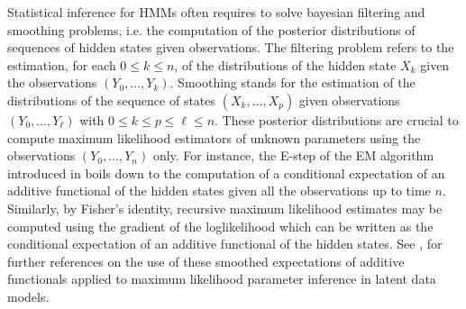 \documentclass[12pt]{article}
\newcommand{\1}{\mathrm{1}}
\begin{document}
Statistical inference for HMMs often requires to solve bayesian filtering and smoothing problems, i.e. the computation of the posterior distributions of sequences of hidden states given observations.
 The filtering problem refers to the estimation, for each $0\le k \le n$,  of the distributions of the hidden state $X_k$ given the observations $(Y_0,\ldots,Y_k)$. Smoothing stands for the estimation of the distributions of the sequence of states $(X_{k},\ldots,X_{p})$ given observations $(Y_{0},\ldots,Y_{\ell})$ with $0\le k\le p \le \ell \le n$. 
These posterior distributions are crucial to compute maximum likelihood estimators of unknown parameters using the observations $(Y_0,\ldots,Y_n)$ only.
 For instance, the E-step of the EM algorithm introduced in \cite{dempster:laird:rubin:1977}  boils down to the computation of a conditional expectation of an additive functional of the hidden states given all the observations up to time $n$.
  Similarly, by Fisher's identity, recursive maximum likelihood estimates may be computed using the gradient of the loglikelihood which can be written as the conditional expectation of an additive functional of the hidden states.
 See \cite[Chapter $10$ and $11$]{cappe:moulines:ryden:2005}, \cite{kantas:doucet:signh:2015,lecorff:fort:2013a,lecorff:fort:2013b,doucet:poyiadjis:singh:2011}
for further references on the use of these smoothed expectations of additive functionals  applied to maximum likelihood parameter inference in latent data models.
\end{document}

